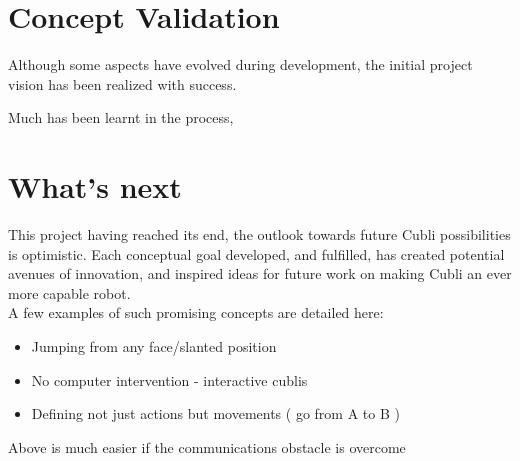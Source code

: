 \section{Concept Validation}

Although some aspects have evolved during development, the initial project vision has been realized with success. 

Much has been learnt in the process,

\section{What's next}

This project having reached its end, the outlook towards future Cubli possibilities is optimistic. Each conceptual goal developed, and fulfilled, has created potential avenues of innovation, and inspired ideas for future work on making Cubli an ever more capable robot.\\

A few examples of such promising concepts are detailed here:

\begin{itemize}
\item Jumping from any face/slanted position

\item No computer intervention - interactive cublis

\item Defining not just actions but movements ( go from A to B )
\end{itemize}

Above is much easier if the communications obstacle is overcome


